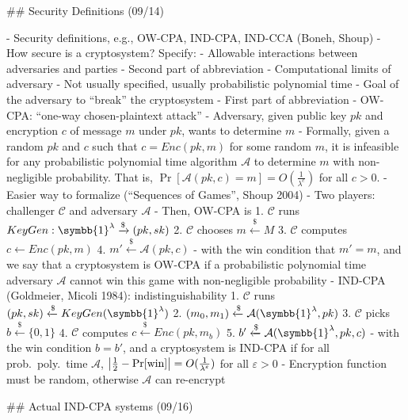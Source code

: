 \documentclass[notes]{agony}
\newcommand{\xgets}{\xleftarrow}
\newcommand{\one}{\symbb{1}}
\begin{document}
\begin{markdown}
## Security Definitions (09/14)

- Security definitions, e.g., OW-CPA, IND-CPA, IND-CCA (Boneh, Shoup)
- How secure is a cryptosystem? Specify:
    - Allowable interactions between adversaries and parties
        - Second part of abbreviation
    - Computational limits of adversary
        - Not usually specified, usually probabilistic polynomial time
    - Goal of the adversary to ``break'' the cryptosystem
        - First part of abbreviation
- OW-CPA: ``one-way chosen-plaintext attack''
    - Adversary, given public key $pk$ and encryption $c$ of message $m$ under $pk$, wants to determine $m$
    - Formally, given a random $pk$ and $c$ such that $c = Enc(pk, m)$ for some random $m$, it is infeasible for any probabilistic polynomial time algorithm $\mathcal A$ to determine $m$ with non-negligible probability. That is, $\Pr[\mathcal A(pk,c) = m] = O(\frac{1}{\lambda^c})$ for all $c > 0$.
- Easier way to formalize (``Sequences of Games'', Shoup 2004)
    - Two players: challenger $\mathcal C$ and adversary $\mathcal A$
    - Then, OW-CPA is
        1. $\mathcal C$ runs $KeyGen : \one^\lambda \xto{\$} (pk, sk)$
        2. $\mathcal C$ chooses $m \xgets{\$} M$
        3. $\mathcal C$ computes $c \gets Enc(pk, m)$
        4. $m' \xgets{\$} \mathcal A(pk, c)$
        - with the win condition that $m' = m$, and we say that a cryptosystem is OW-CPA if a probabilistic polynomial time adversary $\mathcal A$ cannot win this game with non-negligible probability
    - IND-CPA (Goldmeier, Micoli 1984): indistinguishability
        1. $\mathcal C$ runs $(pk, sk) \xgets{\$} KeyGen(\one^\lambda)$
        2. $(m_0,m_1) \xgets{\$} \mathcal A(\one^\lambda, pk)$
        3. $\mathcal C$ picks $b \xgets{\$} \{0,1\}$
        4. $\mathcal C$ computes $c \xgets{\$} Enc(pk, m_b)$
        5. $b' \xgets{\$} \mathcal A(\one^\lambda, pk, c)$
        - with the win condition $b = b'$, and a cryptosystem is IND-CPA if for all prob.\ poly.\ time $\mathcal A$, $\abs{\frac12 - \Pr[\text{win}]} = O(\frac{1}{\lambda^\varepsilon})$ for all $\varepsilon > 0$
        - Encryption function must be random, otherwise $\mathcal A$ can re-encrypt

## Actual IND-CPA systems (09/16)


\end{markdown}
\end{document}
